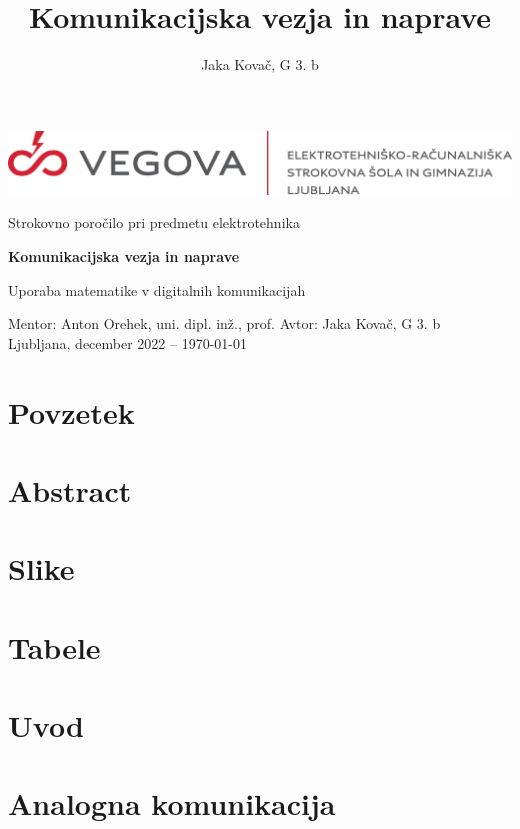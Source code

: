 \documentclass[12pt]{article}
\title{Komunikacijska vezja in naprave}
\author{Jaka Kovač, G 3. b}
\begin{document}

\begin{center}
    \thispagestyle{empty}
    \includegraphics[scale=1]{slike/logotip_vegova_leze_brezokvirja.png}
    
    \vspace{\fill} 
    Strokovno poročilo pri predmetu elektrotehnika

    \Huge{\textbf{Komunikacijska vezja in naprave}}

    \normalsize
    Uporaba matematike v digitalnih komunikacijah
    \vspace{\fill}

    Mentor: Anton Orehek, uni. dipl. inž., prof. \hfill Avtor: Jaka Kovač, G 3. b\\
    \null
    Ljubljana, december 2022 – \MMYYYYdate\today
\end{center}
\newpage
\null
\newpage

\section*{Povzetek}
\section*{Abstract}

\newpage
\tableofcontents

\begingroup
\makeatletter
\section*{Slike}
\let\clearpage\relax
\section*{Tabele}
\makeatother
\endgroup


\newpage
\section{Uvod}
\newpage
\section{Analogna komunikacija}
\end{document}
